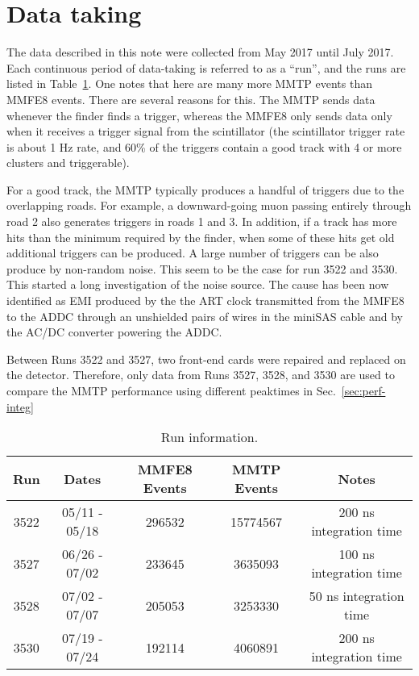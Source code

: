 \section{Data taking}
\label{sec:data-taking}

The data described in this note were collected from May 2017 until July 2017. Each continuous period of data-taking is
 referred to as a ``run'', and the runs are listed in Table~\ref{tab:runs}. 
 One notes that here are many more MMTP events than MMFE8 events. There are several  reasons
 for this. The MMTP sends data whenever the finder finds a trigger, whereas the MMFE8 only sends
 data only when it receives a trigger signal from the scintillator (the scintillator trigger rate is about 1 Hz rate,
 and 60\% of the triggers contain a good track with 4 or more clusters and triggerable).

 For a good track, the MMTP  typically produces a handful of triggers 
 due to the overlapping roads. For example, a downward-going muon passing entirely through road 2
 also generates triggers in roads 1 and 3. In addition, if a track has more hits than the minimum required by the finder,
 when some of these hits get old additional triggers can be produced.
 A large number of triggers can be also produce by non-random noise.
 This seem to be the case for  run 3522 and 3530.
 This started a long investigation of the noise source. The cause has been now identified as
 EMI produced by the  the ART clock transmitted from the MMFE8 to the ADDC through an unshielded pairs of wires
 in the miniSAS cable and by the AC/DC converter powering the ADDC. 

 Between Runs 3522 and 3527, two front-end cards were repaired and replaced on the detector. Therefore, only
 data from Runs 3527, 3528, and 3530 are used to compare
the MMTP performance using different peaktimes in Sec.~\ref{sec:perf-integ}
\begin{table}[!htpb]
\begin{center}
  \begin{tabular}{c | c | c | c | c}
    Run  & Dates         & MMFE8 Events & MMTP Events & Notes \\
    \hline
    3522 & 05/11 - 05/18 & 296532       & 15774567    & 200 ns integration time \\
    3527 & 06/26 - 07/02 & 233645       & 3635093     & 100 ns integration time \\
    3528 & 07/02 - 07/07 & 205053       & 3253330     & 50 ns integration time \\
    3530 & 07/19 - 07/24 & 192114       & 4060891     & 200 ns integration time \\
  \end{tabular}
  \caption{Run information.  }
\label{tab:runs}
\end{center}
\end{table}

